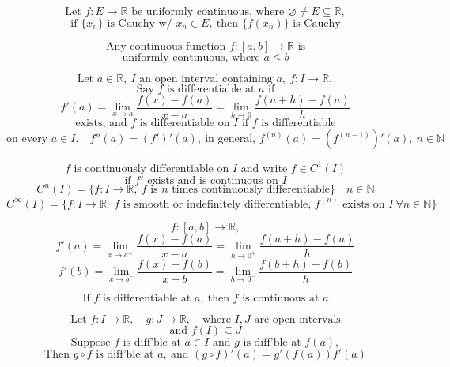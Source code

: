 \documentclass[11pt]{article}
\begin{document}

\[
\text{Let } f:E\to\mathbb R \text{ be uniformly continuous, where } \varnothing\ne E\subseteq\mathbb R,
\]
\[
\text{if } \{x_n\} \text{ is Cauchy w/ } x_n\in E,\ \text{then } \{f(x_n)\} \text{ is Cauchy}
\]


\[
\text{Any continuous function } f:[a,b]\to\mathbb R \text{ is}
\]
\[
\text{uniformly continuous, where } a\le b
\]



\[
\text{Let } a\in\mathbb R,\ I \text{ an open interval containing }a,\ f:I\to\mathbb R,
\]
\[
\text{Say } f \text{ is differentiable at } a \text{ if}
\]
\[
f'(a)=\lim_{x\to a}\frac{f(x)-f(a)}{x-a}
=\lim_{h\to0}\frac{f(a+h)-f(a)}{h}
\]
\[
\text{exists, and } f \text{ is differentiable on } I \text{ if } f \text{ is differentiable}
\]
\[
\text{on every } a\in I.\quad
f''(a)=(f')'(a),\ \text{in general, } f^{(n)}(a)=\left(f^{(n-1)}\right)'(a),\ n\in\mathbb N
\]


\[
f \text{ is continuously differentiable on } I \text{ and write } f\in C^1(I)
\]
\[
\text{if } f' \text{ exists and is continuous on } I
\]
\[
C^n(I)=\{f:I\to\mathbb R,\ f \text{ is } n \text{ times continuously differentiable}\}
\quad n\in\mathbb N
\]
\[
C^\infty(I)=\{f:I\to\mathbb R:\ f \text{ is smooth or indefinitely differentiable, }
f^{(n)} \text{ exists on } I\ \forall n\in\mathbb N\}
\]

\newpage


\[
f:[a,b]\to\mathbb R,
\]
\[
f'(a)=\lim_{x\to a^+}\frac{f(x)-f(a)}{x-a}
=\lim_{h\to0^+}\frac{f(a+h)-f(a)}{h}
\]
\[
f'(b)=\lim_{x\to b^-}\frac{f(x)-f(b)}{x-b}
=\lim_{h\to0^-}\frac{f(b+h)-f(b)}{h}
\]


\[
\text{If } f \text{ is differentiable at } a,\ \text{then } f \text{ is continuous at } a
\]


\[
\text{Let } f:I\to\mathbb R,\quad g:J\to\mathbb R,\quad \text{where } I,J \text{ are open intervals}
\]
\[
\text{and } f(I)\subseteq J
\]
\[
\text{Suppose } f \text{ is diff'ble at } a\in I \text{ and } g \text{ is diff'ble at } f(a),
\]
\[
\text{Then } g\circ f \text{ is diff'ble at } a,\ \text{and } (g\circ f)'(a)=g'(f(a))f'(a)
\]
\end{document}
